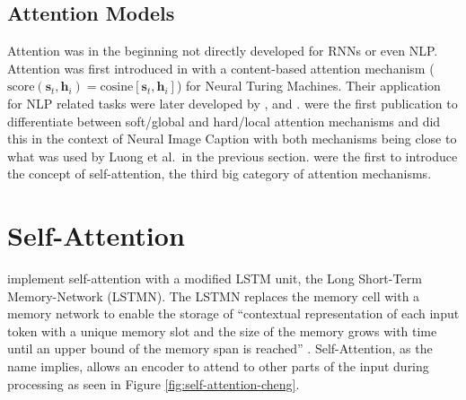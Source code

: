 \documentclass[]{krantz}
\begin{document}
\hypertarget{attention-models}{%
\subsection{Attention Models}\label{attention-models}}

Attention was in the beginning not directly developed for RNNs or even NLP.
Attention was first introduced in \citet{GravesWD14} with a content-based attention mechanism
(\(\text{score}(\boldsymbol{s}_t, \boldsymbol{h}_i) = \text{cosine}[\boldsymbol{s}_t, \boldsymbol{h}_i]\))
for Neural Turing Machines. Their application for NLP related tasks were later developed by
\citet{luong2015effective}, \citet{bahdanau2014neural} and \citet{xu2015show}.
\citet{xu2015show} were the first publication to differentiate between soft/global and hard/local attention mechanisms and did this in the
context of Neural Image Caption with both mechanisms being close to what was used
by Luong et al.~in the previous section. \citet{cheng2016long} were the first to introduce the concept of self-attention, the third big
category of attention mechanisms.

\hypertarget{self-attention}{%
\section{Self-Attention}\label{self-attention}}

\citet{cheng2016long} implement self-attention with a modified LSTM unit, the Long Short-Term
Memory-Network (LSTMN). The LSTMN replaces the memory cell with a memory network to enable
the storage of ``contextual representation of each input token with
a unique memory slot and the size of the memory
grows with time until an upper bound of the memory
span is reached'' \citet{cheng2016long}.
Self-Attention, as the name implies, allows an encoder to attend to other parts of the input during processing as seen in Figure \ref{fig:self-attention-cheng}.
\end{document}
